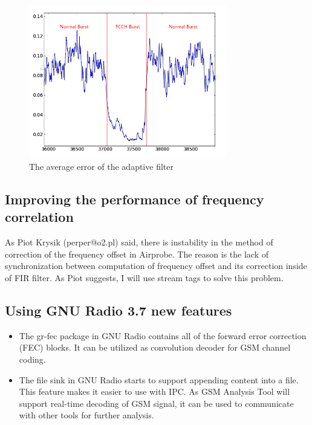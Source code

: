 \documentclass[a4paper,12pt,oneside]{article}
\begin{document}
\begin{figure}[!h]
\centering\includegraphics[width=3.4in]{figure/fcch_detect.png}
\caption{The average error of the adaptive filter\label{fig:fch}}
\end{figure}


\subsection{Improving the performance of frequency correlation}

As Piot Krysik (perper@o2.pl) said, there is instability in the method of correction of the frequency offset in Airprobe. The reason is the lack of synchronization between computation of frequency offset and its correction inside of FIR filter. As Piot suggests, I will use stream tags to solve this problem.

\subsection{Using GNU Radio 3.7 new features}
\begin{itemize}
\item The gr-fec package in GNU Radio contains all of the forward error correction (FEC) blocks. It can be utilized as convolution
decoder for GSM channel coding.

\item The file sink in GNU Radio starts to support appending content into a file. This feature makes it easier to use with IPC.
As GSM Analysis Tool will support real-time decoding of GSM signal, it can be used to communicate with other tools for
further analysis.
\end{itemize}
\end{document}
